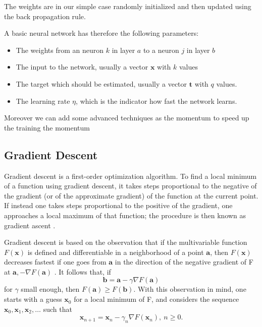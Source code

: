 \documentclass{acm_proc_article-sp}
\begin{document}
The weights are in our simple case randomly initialized and then updated using the back propagation rule.

A basic neural network has therefore the following parameters:
\begin{itemize}
\item The weights from an neuron $k$ in layer $a$ to a neuron $j$ in layer $b$
\item The input to the network, usually a vector $\mathbf{x}$ with $k$ values
\item The target which should be estimated, usually a vector $\mathbf{t}$ with $q$ values.
\item The learning rate $\eta$, which is the indicator how fast the network learns.
\end{itemize}

Moreover we can add some advanced techniques as the momentum to speed up the training the momentum 


\subsection{Gradient Descent}
Gradient descent is a first-order optimization algorithm. To find a local minimum of a function using gradient descent, it takes steps proportional to the negative of the gradient (or of the approximate gradient) of the function at the current point. If instead one takes steps proportional to the positive of the gradient, one approaches a local maximum of that function; the procedure is then known as gradient ascent \cite{Kiwiel2001,Qian1999}.

Gradient descent is based on the observation that if the multivariable function $F(\mathbf{x})$ is defined and differentiable in a neighborhood of a point $\mathbf{a}$, then $F(\mathbf{x})$ decreases fastest if one goes from $\mathbf{a}$ in the direction of the negative gradient of F at $\mathbf{a}, -\nabla F(\mathbf{a})$ \cite{Yuan1999}. It follows that, if
\begin{equation}
\mathbf{b} = \mathbf{a}-\gamma\nabla F(\mathbf{a})
\end{equation}
for $\gamma$ small enough, then $F(\mathbf{a})\geq F(\mathbf{b})$. With this observation in mind, one starts with a guess $\mathbf{x}_0$ for a local minimum of F, and considers the sequence $\mathbf{x}_0, \mathbf{x}_1, \mathbf{x}_2, \dots$ such that
\begin{equation}
\mathbf{x}_{n+1}=\mathbf{x}_n-\gamma_n \nabla F(\mathbf{x}_n),\ n \ge 0.
\end{equation}
\end{document}
